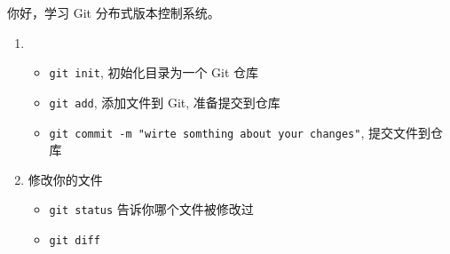 \documentclass[UTF8]{ctexart}
\begin{document}
你好，学习 Git 分布式版本控制系统。\par
\begin{enumerate}
  \item
  \begin{itemize}
    \item \verb|git init|, 初始化目录为一个 Git 仓库
    \item \verb|git add|, 添加文件到 Git, 准备提交到仓库
    \item \verb|git commit -m "wirte somthing about your changes"|, 提交文件到仓库
  \end{itemize}
  \item 修改你的文件
  \begin{itemize}
    \item \verb|git status| 告诉你哪个文件被修改过
    \item \verb|git diff|
  \end{itemize}
\end{enumerate}
\end{document}
